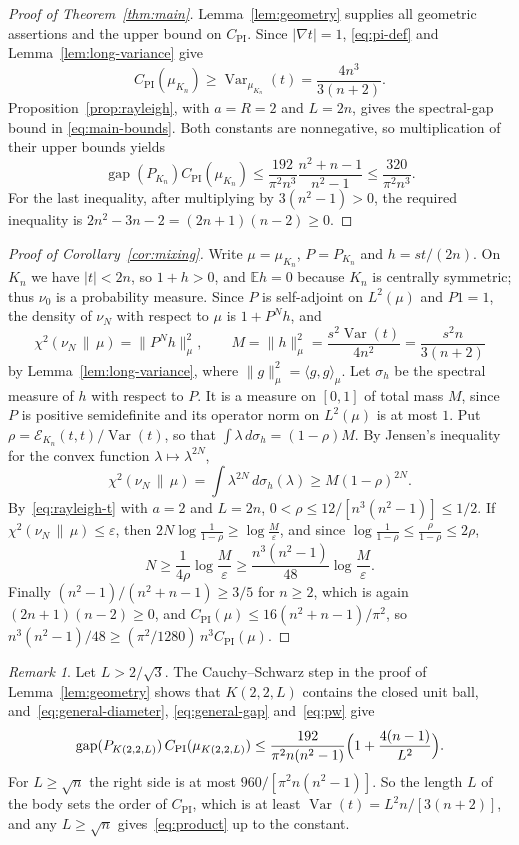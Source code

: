 \documentclass[11pt]{amsart}
\theoremstyle{remark}
\newtheorem{remark}[theorem]{Remark}
\numberwithin{equation}{section}
\newcommand{\E}{\mathbb E}
\newcommand{\Var}{\operatorname{Var}}
\newcommand{\gap}{\operatorname{gap}}
\newcommand{\CPI}{C_{\mathrm{PI}}}
\begin{document}
\begin{proof}[Proof of Theorem~\ref{thm:main}]
Lemma~\ref{lem:geometry} supplies all geometric assertions and the upper
bound on $\CPI$. Since $|\nabla t|=1$, \eqref{eq:pi-def} and
Lemma~\ref{lem:long-variance} give
\[
 \CPI(\mu_{K_n})\ge\Var_{\mu_{K_n}}(t)
 =\frac{4n^3}{3(n+2)}.
\]
Proposition~\ref{prop:rayleigh}, with $a=R=2$ and $L=2n$, gives the
spectral-gap bound in \eqref{eq:main-bounds}.
Both constants are nonnegative, so multiplication of their upper bounds
yields
\[
 \gap(P_{K_n})\CPI(\mu_{K_n})
 \le\frac{192}{\pi^2 n^3}\frac{n^2+n-1}{n^2-1}
 \le\frac{320}{\pi^2n^3}.
\]
For the last inequality, after multiplying by $3(n^2-1)>0$, the
required inequality is $2n^2-3n-2=(2n+1)(n-2)\ge0$.
\end{proof}


\begin{proof}[Proof of Corollary~\ref{cor:mixing}]
Write $\mu=\mu_{K_n}$, $P=P_{K_n}$ and $h=st/(2n)$. On $K_n$ we have
$|t|<2n$, so $1+h>0$, and $\E h=0$ because $K_n$ is centrally symmetric;
thus $\nu_0$ is a probability measure. Since $P$ is self-adjoint on
$L^2(\mu)$ and $P1=1$, the density of $\nu_N$ with respect to $\mu$ is
$1+P^Nh$, and
\[
 \chi^2(\nu_N\,\|\,\mu)=\|P^Nh\|^2_{\mu},\qquad
 M=\|h\|_\mu^2=\frac{s^2\Var(t)}{4n^2}=\frac{s^2n}{3(n+2)}
\]
by Lemma~\ref{lem:long-variance}, where $\|g\|_\mu^2=\langle g,g\rangle_\mu$.
Let $\sigma_h$ be the spectral measure of $h$ with respect to $P$. It is a
measure on $[0,1]$ of total mass $M$, since $P$ is positive semidefinite
and its operator norm on $L^2(\mu)$ is at most $1$. Put
$\rho=\mathcal E_{K_n}(t,t)/\Var(t)$, so that $\int\lambda\,d\sigma_h=(1-\rho)M$.
By Jensen's inequality for the convex function $\lambda\mapsto\lambda^{2N}$,
\[
 \chi^2(\nu_N\,\|\,\mu)=\int\lambda^{2N}\,d\sigma_h(\lambda)\ge
 M(1-\rho)^{2N}.
\]
By~\eqref{eq:rayleigh-t} with $a=2$ and $L=2n$,
$0<\rho\le12/[n^3(n^2-1)]\le1/2$. If
$\chi^2(\nu_N\,\|\,\mu)\le\varepsilon$, then
$2N\log\frac1{1-\rho}\ge\log\frac M\varepsilon$, and since
$\log\frac1{1-\rho}\le\frac{\rho}{1-\rho}\le2\rho$,
\[
 N\ge\frac{1}{4\rho}\log\frac M\varepsilon
 \ge\frac{n^3(n^2-1)}{48}\log\frac M\varepsilon .
\]
Finally $(n^2-1)/(n^2+n-1)\ge3/5$ for $n\ge2$, which is again
$(2n+1)(n-2)\ge0$, and $\CPI(\mu)\le16(n^2+n-1)/\pi^2$, so
$n^3(n^2-1)/48\ge(\pi^2/1280)\,n^3\CPI(\mu)$.
\end{proof}

\begin{remark}
Let $L>2/\sqrt3$. The Cauchy--Schwarz step in the proof of
Lemma~\ref{lem:geometry} shows that $K(2,2,L)$ contains the closed unit
ball, and~\eqref{eq:general-diameter}, \eqref{eq:general-gap}
and~\eqref{eq:pw} give
\[
 \gap(P_{K(2,2,L)})\,\CPI(\mu_{K(2,2,L)})
 \le\frac{192}{\pi^2n(n^2-1)}\Bigl(1+\frac{4(n-1)}{L^2}\Bigr).
\]
For $L\ge\sqrt n$ the right side is at most $960/[\pi^2n(n^2-1)]$. So the length $L$ of the
body sets the order of $\CPI$, which is at least $\Var(t)=L^2n/[3(n+2)]$, and any $L\ge\sqrt n$
gives~\eqref{eq:product} up to the constant.
\end{remark}
\end{document}
